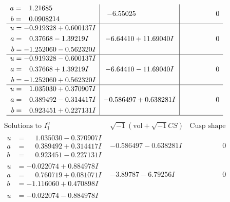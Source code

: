 \documentclass[1p]{elsarticle_modified}
\theoremstyle{definition}
\newcommand{\I}{\sqrt{-1}}
\begin{document}
$$\begin{array}{c|c|c}
\begin{aligned}
a &= \phantom{-}1.21685\phantom{ +0.000000I} \\
b &= \phantom{-}0.0908214\phantom{ +0.000000I}\end{aligned}
 & -6.55025\phantom{ +0.000000I} & \phantom{-0.000000 } 0 \\ \hline\begin{aligned}
u &= -0.919328 + 0.600137 I \\
a &= \phantom{-}0.37668 - 1.39219 I \\
b &= -1.252060 - 0.562320 I\end{aligned}
 & -6.64410 + 11.69040 I & \phantom{-0.000000 } 0 \\ \hline\begin{aligned}
u &= -0.919328 - 0.600137 I \\
a &= \phantom{-}0.37668 + 1.39219 I \\
b &= -1.252060 + 0.562320 I\end{aligned}
 & -6.64410 - 11.69040 I & \phantom{-0.000000 } 0 \\ \hline\begin{aligned}
u &= \phantom{-}1.035030 + 0.370907 I \\
a &= \phantom{-}0.389492 - 0.314417 I \\
b &= \phantom{-}0.923451 + 0.227131 I\end{aligned}
 & -0.586497 + 0.638281 I & \phantom{-0.000000 } 0\\
 \hline 
 \end{array}$$\newpage$$\begin{array}{c|c|c}  
\text{Solutions to }I^u_{1}& \I (\text{vol} + \sqrt{-1}CS) & \text{Cusp shape}\\
 \hline 
\begin{aligned}
u &= \phantom{-}1.035030 - 0.370907 I \\
a &= \phantom{-}0.389492 + 0.314417 I \\
b &= \phantom{-}0.923451 - 0.227131 I\end{aligned}
 & -0.586497 - 0.638281 I & \phantom{-0.000000 } 0 \\ \hline\begin{aligned}
u &= -0.022074 + 0.884978 I \\
a &= \phantom{-}0.760719 + 0.081071 I \\
b &= -1.116060 + 0.470898 I\end{aligned}
 & -3.89787 - 6.79256 I & \phantom{-0.000000 } 0 \\ \hline\begin{aligned}
u &= -0.022074 - 0.884978 I \\

\end{aligned}
\end{array}$$
\end{document}
